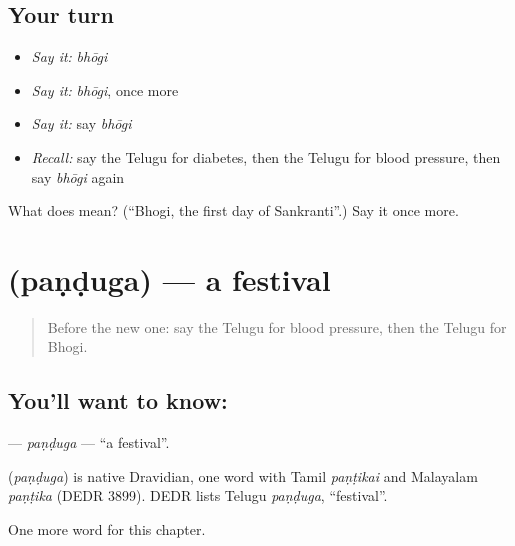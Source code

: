 \subsection*{Your turn}
\begin{itemize}
\raggedright
  \item \emph{Say it:} \emph{bhōgi}
  \item \emph{Say it:} \emph{bhōgi}, once more
  \item \emph{Say it:} say \emph{bhōgi}
  \item \emph{Recall:} say the Telugu for diabetes, then the Telugu for blood pressure, then say \emph{bhōgi} again
\end{itemize}

\begin{tcolorbox}[breakable,colback=teal!4,colframe=teal!35!black,title={Before you move on}]
What does  mean? (\textquotedblleft{}Bhogi, the first day of Sankranti\textquotedblright{}.) Say it once more.
\end{tcolorbox}
\section[\texorpdfstring{\te{పండుగ} (paṇḍuga)}{పండుగ (paṇḍuga)}]{ (paṇḍuga) — a festival}

\label{lesson:TE-C289-panduga}



\begin{quote}
Before the new one: say the Telugu for blood pressure, then the Telugu for Bhogi.
\end{quote}

\subsection*{You'll want to know: }
\textbf{} — \emph{paṇḍuga} — \textquotedblleft{}a festival\textquotedblright{}.

\begin{cousinweb}
\textbf{} (\emph{paṇḍuga}) is native Dravidian, one word with Tamil \emph{paṇṭikai} and Malayalam \emph{paṇṭika} (DEDR 3899). DEDR lists Telugu \emph{paṇḍuga}, \textquotedblleft{}festival\textquotedblright{}.
\end{cousinweb}

\begin{grammarlens}[title={What you've built}]
One more word for this chapter.
\end{grammarlens}

